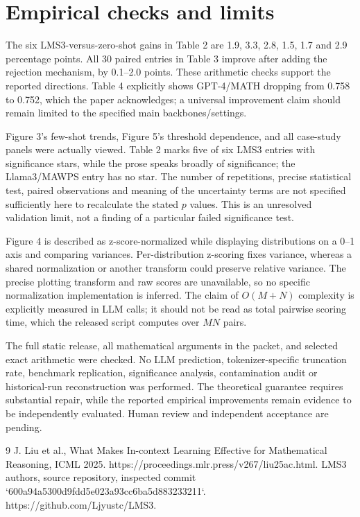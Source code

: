 \documentclass[10pt]{article}
\begin{document}
\section*{Empirical checks and limits}
The six LMS3-versus-zero-shot gains in Table 2 are 1.9, 3.3, 2.8, 1.5, 1.7 and 2.9 percentage points. All 30 paired entries in Table 3 improve after adding the rejection mechanism, by 0.1–2.0 points. These arithmetic checks support the reported directions. Table 4 explicitly shows GPT-4/MATH dropping from 0.758 to 0.752, which the paper acknowledges; a universal improvement claim should remain limited to the specified main backbones/settings.\par
Figure 3’s few-shot trends, Figure 5’s threshold dependence, and all case-study panels were actually viewed. Table 2 marks five of six LMS3 entries with significance stars, while the prose speaks broadly of significance; the Llama3/MAWPS entry has no star. The number of repetitions, precise statistical test, paired observations and meaning of the uncertainty terms are not specified sufficiently here to recalculate the stated \(p\) values. This is an unresolved validation limit, not a finding of a particular failed significance test.\par
Figure 4 is described as z-score-normalized while displaying distributions on a 0–1 axis and comparing variances. Per-distribution z-scoring fixes variance, whereas a shared normalization or another transform could preserve relative variance. The precise plotting transform and raw scores are unavailable, so no specific normalization implementation is inferred. The claim of \(O(M+N)\) complexity is explicitly measured in LLM calls; it should not be read as total pairwise scoring time, which the released script computes over \(MN\) pairs.\par
The full static release, all mathematical arguments in the packet, and selected exact arithmetic were checked. No LLM prediction, tokenizer-specific truncation rate, benchmark replication, significance analysis, contamination audit or historical-run reconstruction was performed. The theoretical guarantee requires substantial repair, while the reported empirical improvements remain evidence to be independently evaluated. Human review and independent acceptance are pending.\par
9 J. Liu et al., What Makes In-context Learning Effective for Mathematical Reasoning, ICML 2025. https://proceedings.mlr.press/v267/liu25ac.html. LMS3 authors, source repository, inspected commit `600a94a5300d9fdd5e023a93cc6ba5d883233211`. https://github.com/Ljyustc/LMS3.\par
\end{document}
